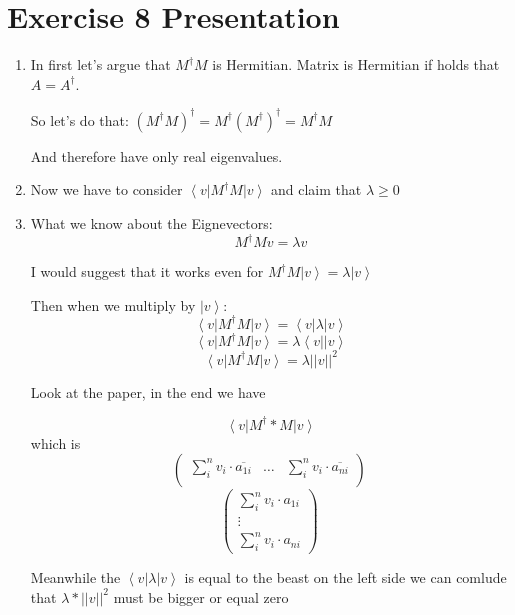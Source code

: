 \documentclass[a4paper,10pt]{article}
\newcommand{\bra}[1]{\ensuremath{\left\langle#1\right|}} %
\newcommand{\ket}[1]{\ensuremath{\left|#1\right\rangle}} %
\begin{document}
\section*{Exercise 8 Presentation}
\begin{enumerate}[1]
\item In first let's argue that $M^\dagger M$ is Hermitian. Matrix is Hermitian if holds that $A = A^\dagger$.

So let's do that:
$(M^\dagger M)^\dagger = M^\dagger (M^\dagger)^\dagger = M^\dagger M$

And therefore have only real eigenvalues.

\item Now we have to consider $\bra{v} M^\dagger M \ket{v}$ and claim that $\lambda \geq 0$

\item What we know about the Eignevectors:
$$
M^\dagger M v = \lambda v
$$

I would suggest that it works even for $M^\dagger M \ket{v} = \lambda \ket{v}$

Then when we multiply by \ket{v}:
$$
\bra{v} M^\dagger M \ket{v} = \bra{v} \lambda \ket{v}
$$
$$
\bra{v} M^\dagger M \ket{v} = \lambda \bra{v} \ket{v}
$$
$$
\bra{v} M^\dagger M \ket{v} = \lambda ||v||^2
$$

Look at the paper, in the end we have 

$$
\bra{v}M^\dagger * M\ket{v}
$$
which is
$$
\left( \begin{array}{ccc}
\sum_i^n v_i\cdot \overline{a_{1i}} & \hdots & \sum_i^n v_i\cdot \overline{a_{ni}}  \\
\end{array} \right)\
$$
$$
\left( \begin{array}{c}
\sum_i^n v_i\cdot a_{1i} \\
\vdots \\
\sum_i^n v_i\cdot a_{ni} 
\end{array} \right)\
$$

Meanwhile the $\bra{v} \lambda \ket{v}$ is equal to the beast on the left side we can comlude that $\lambda * ||v||^2$ must be bigger or equal zero
\end{enumerate}
\end{document}
